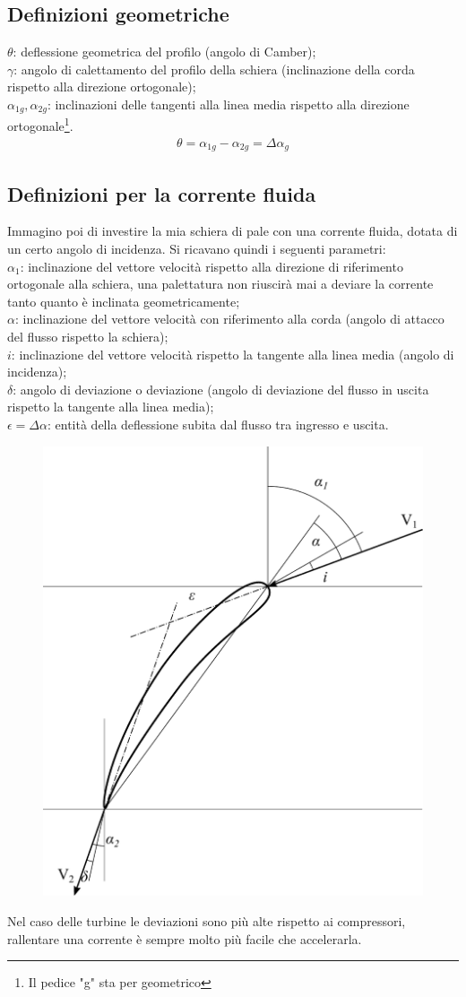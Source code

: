 \subsection{Definizioni geometriche}
$\theta$: deflessione geometrica del profilo (angolo di Camber);\\
$\gamma$: angolo di calettamento del profilo della schiera (inclinazione della corda rispetto alla direzione ortogonale);\\
$\alpha_{1g}, \alpha_{2g}$: inclinazioni delle tangenti alla linea media rispetto alla direzione ortogonale\footnote{Il pedice "g" sta per geometrico}.
\begin{align*}
\theta = \alpha_{1g} - \alpha_{2g} = \Delta \alpha_{g}
\end{align*}

\subsection{Definizioni per la corrente fluida}
Immagino poi di investire la mia schiera di pale con una corrente fluida, dotata di un certo angolo di incidenza. Si ricavano quindi i seguenti parametri:\\[2mm]
$\alpha_1$: inclinazione del vettore velocità rispetto alla direzione di riferimento ortogonale alla schiera, una palettatura non riuscirà mai a deviare la corrente tanto quanto è inclinata geometricamente;\\
$\alpha$: inclinazione del vettore velocità con riferimento alla corda (angolo di attacco del flusso rispetto la schiera);\\
$i$: inclinazione del vettore velocità rispetto la tangente alla linea media (angolo di incidenza);\\
$\delta$: angolo di deviazione o deviazione (angolo di deviazione del flusso in uscita rispetto la tangente alla linea media);\\
$\epsilon = \Delta \alpha$: entità della deflessione subita dal flusso tra ingresso e uscita.\\[2mm]
\begin{figure}
\centering
  \includegraphics[width=.45\textwidth]{fig/palasing.pdf}
\caption{}
\label{fig:palasing}
\end{figure}
Nel caso delle turbine le deviazioni sono più alte rispetto ai compressori, rallentare una corrente è sempre molto più facile che accelerarla. 

